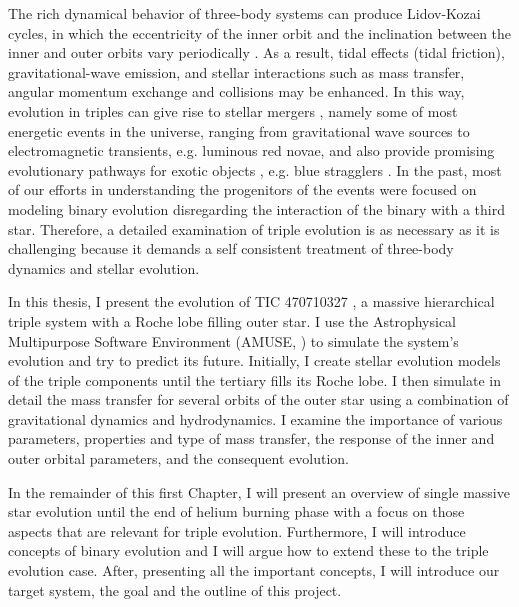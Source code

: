 The rich dynamical behavior of three-body systems can produce Lidov-Kozai cycles, in which the eccentricity of the inner orbit and the inclination between the inner and outer orbits vary periodically \citep{michaely2014secular,toonen2016evolution,mangipudi2022extreme}. As a result, tidal effects (tidal friction), gravitational-wave emission, and stellar interactions such as mass transfer, angular momentum exchange and collisions may be enhanced. In this way, evolution in triples can give rise to stellar mergers \citep{antonini2017binary,silsbee2017lidov,vigna2021massive}, namely some of most energetic events in the universe, ranging from gravitational wave sources to electromagnetic transients, e.g. luminous red novae, and also provide promising evolutionary pathways for exotic objects \citep{sana2012binary, toonen2016evolution}, e.g. blue stragglers \citep{winn2009spin}. In the past, most of our efforts in understanding the progenitors of the events were focused on modeling binary evolution disregarding the interaction of the binary with a third star. Therefore, a detailed examination of triple evolution is as necessary as it is challenging because it demands a self consistent treatment of three-body dynamics and stellar evolution.

In this thesis, I present the evolution of TIC 470710327 \citep{eisner2022planet}, a massive hierarchical triple system with a Roche lobe filling outer star. I use the Astrophysical Multipurpose Software Environment (AMUSE, \cite{portegies2018astrophysical}) to simulate the system's evolution and try to predict its future. Initially, I create stellar evolution models of the triple components until the tertiary fills its Roche lobe. I then simulate in detail the mass transfer for several orbits of the outer star using a combination of gravitational dynamics and hydrodynamics. I examine the importance of various parameters, properties and type of mass transfer, the response of the inner and outer orbital parameters, and the consequent evolution.

In the remainder of this first Chapter, I will present an overview of single massive star evolution until the end of helium burning phase with a focus on those aspects that are relevant for triple evolution. Furthermore, I will introduce concepts of binary evolution and I will argue how to extend these to the triple evolution case. After, presenting all the important concepts, I will introduce our target system, the goal and the outline of this project. 















